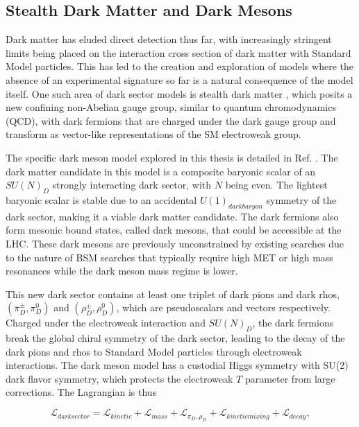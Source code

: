 \subsection{Stealth Dark Matter and Dark Mesons}

Dark matter has eluded direct detection thus far, with increasingly stringent limits being placed on the interaction cross section of dark matter with Standard Model particles.
This has led to the creation and exploration of models where the absence of an experimental signature so far is a natural consequence of the model itself.
One such area of dark sector models is stealth dark matter \cite{Kribs_2016}, which posits a new confining non-Abelian gauge group, similar to quantum chromodynamics (QCD), with dark fermions that are charged under the dark gauge group and transform as vector-like representations of the SM electroweak group.

The specific dark meson model explored in this thesis is detailed in Ref. \cite{kribs_2019}.
The dark matter candidate in this model is a composite baryonic scalar of an $SU(N)_D$ strongly interacting dark sector, with $N$ being even.
The lightest baryonic scalar is stable due to an accidental $U(1)_{dark baryon}$ symmetry of the dark sector, making it a viable dark matter candidate.
The dark fermions also form mesonic bound states, called dark mesons, that could be accessible at the LHC.
These dark mesons are previously unconstrained by existing searches due to the nature of BSM searches that typically require high MET or high mass resonances while the dark meson mass regime is lower.

This new dark sector contains at least one triplet of dark pions and dark rhos, $(\pi^{\pm}_D,\pi^0_D)$ and $(\rho^{\pm}_D,\rho^0_D)$, which are pseudoscalars and vectors respectively.
Charged under the electroweak interaction and $SU(N)_D$, the dark fermions break the global chiral symmetry of the dark sector, leading to the decay of the dark pions and rhos to Standard Model particles through electroweak interactions. 
The dark meson model has a custodial Higgs symmetry with SU(2) dark flavor symmetry, which protects the electroweak $T$ parameter from large corrections.
The Lagrangian is thus

\begin{equation}
    \mathcal{L}_{dark sector} = \mathcal{L}_{kinetic} + \mathcal{L}_{mass} + \mathcal{L}_{\pi_D,\rho_D} + \mathcal{L}_{kinetic mixing} + \mathcal{L}_{decay},
    \label{dark_sector_lagrangian}
\end{equation}

